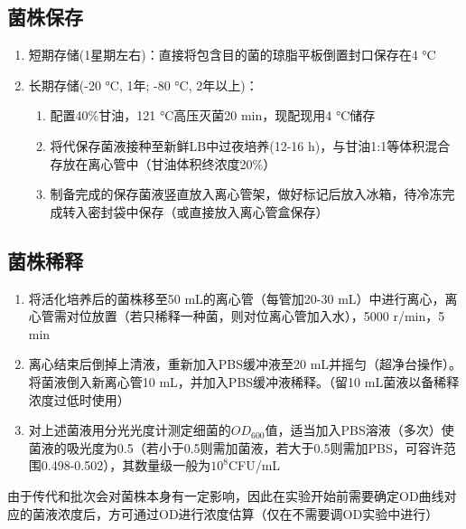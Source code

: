 \documentclass[
]{book}
\providecommand{\tightlist}{%
  \setlength{\itemsep}{0pt}\setlength{\parskip}{0pt}}
\begin{document}
\hypertarget{ux83ccux682aux4fddux5b58}{%
\subsection{菌株保存}\label{ux83ccux682aux4fddux5b58}}

\begin{enumerate}
\def\labelenumi{\arabic{enumi}.}
\tightlist
\item
  短期存储(1星期左右)：直接将包含目的菌的琼脂平板倒置封口保存在4 °C
\item
  长期存储(-20 °C, 1年; -80 °C, 2年以上)：

  \begin{enumerate}
  \def\labelenumii{\arabic{enumii}.}
  \tightlist
  \item
    配置40\%甘油，121 °C高压灭菌20 min，现配现用4 °C储存
  \item
    将代保存菌液接种至新鲜LB中过夜培养(12-16 h)，与甘油1:1等体积混合存放在离心管中（甘油体积终浓度20\%）
  \item
    制备完成的保存菌液竖直放入离心管架，做好标记后放入冰箱，待冷冻完成转入密封袋中保存（或直接放入离心管盒保存）
  \end{enumerate}
\end{enumerate}

\hypertarget{ux83ccux682aux7a00ux91ca}{%
\subsection{菌株稀释}\label{ux83ccux682aux7a00ux91ca}}

\begin{enumerate}
\def\labelenumi{\arabic{enumi}.}
\tightlist
\item
  将活化培养后的菌株移至50 mL的离心管（每管加20-30 mL）中进行离心，离心管需对位放置（若只稀释一种菌，则对位离心管加入水），5000 r/min，5 min
\item
  离心结束后倒掉上清液，重新加入PBS缓冲液至20 mL并摇匀（超净台操作）。将菌液倒入新离心管10 mL，并加入PBS缓冲液稀释。（留10 mL菌液以备稀释浓度过低时使用）
\item
  对上述菌液用分光光度计测定细菌的\(OD_{600}\)值，适当加入PBS溶液（多次）使菌液的吸光度为0.5（若小于0.5则需加菌液，若大于0.5则需加PBS，可容许范围0.498-0.502），其数量级一般为\(10^8\)CFU/mL
\end{enumerate}

由于传代和批次会对菌株本身有一定影响，因此在实验开始前需要确定OD曲线对应的菌液浓度后，方可通过OD进行浓度估算（仅在不需要调OD实验中进行）
\end{document}
